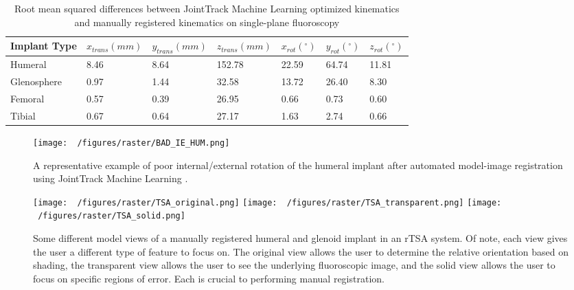 \begin{table}
	\caption{Root mean squared differences between JointTrack Machine Learning optimized kinematics and manually registered kinematics on single-plane fluoroscopy} \label{tab:jtml-tsa-tka-vals}
	\begin{tabularx}{\linewidth}{|X|X|X|X|X|X|X|}\hline
		{\bf Implant Type} & $x_{trans} (mm)$ & $y_{trans} (mm)$ & $z_{trans} (mm)$ & $x_{rot} (^{\circ})$ & $y_{rot} (^{\circ})$ & $z_{rot} (^{\circ})$ \\ \hline
		Humeral            & 8.46             & 8.64             & 152.78           & 22.59                & 64.74                & 11.81                \\\hline
		Glenosphere        & 0.97             & 1.44             & 32.58            & 13.72                & 26.40                & 8.30                 \\\hline
		Femoral            & 0.57             & 0.39             & 26.95            & 0.66                 & 0.73                 & 0.60                 \\\hline
		Tibial             & 0.67             & 0.64             & 27.17            & 1.63                 & 2.74                 & 0.66                 \\\hline
	\end{tabularx}
\end{table}


\begin{figure}[h!]
	\centering
	\texttt{[image: ~/figures/raster/BAD\_IE\_HUM.png]}
	\caption{A representative example of poor internal/external rotation of the humeral implant after automated model-image registration using JointTrack Machine Learning \cite{jensenJointTrackMachine2023}.}
	\label{fig:bad_ie_hum}
\end{figure}


\begin{figure}[h!]
	\centering
	\texttt{[image: ~/figures/raster/TSA\_original.png]}
	\texttt{[image: ~/figures/raster/TSA\_transparent.png]}
	\texttt{[image: ~/figures/raster/TSA\_solid.png]}
	\caption{Some different model views of a manually registered humeral and glenoid implant in an rTSA system. Of note, each view gives the user a different type of feature to focus on. The original view allows the user to determine the relative orientation based on shading, the transparent view allows the user to see the underlying fluoroscopic image, and the solid view allows the user to focus on specific regions of error. Each is crucial to performing manual registration.}
	\label{fig:TSA-multiview}
\end{figure}

